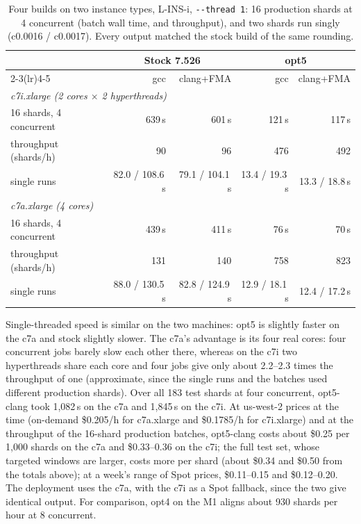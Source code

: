 \documentclass[11pt]{article}
\newcommand{\code}[1]{\texttt{#1}}
\begin{document}
\begin{table}[h]
\centering
\caption{Four builds on two instance types, L-INS-i, \code{-{}-thread 1}: 16 production
shards at 4 concurrent (batch wall time, and throughput), and two shards run singly
(c0.0016 / c0.0017). Every output matched the stock build of the same rounding.}
\label{tab:x86four}
\begin{tabular}{lrrrr}
\toprule
& \multicolumn{2}{c}{Stock 7.526} & \multicolumn{2}{c}{opt5} \\
\cmidrule(lr){2-3}\cmidrule(lr){4-5}
& gcc & clang+FMA & gcc & clang+FMA \\
\midrule
\multicolumn{5}{l}{\emph{c7i.xlarge (2 cores $\times$ 2 hyperthreads)}} \\
16 shards, 4 concurrent & 639\,s & 601\,s & 121\,s & 117\,s \\
\quad throughput (shards/h) & 90 & 96 & 476 & 492 \\
single runs & 82.0 / 108.6\,s & 79.1 / 104.1\,s & 13.4 / 19.3\,s & 13.3 / 18.8\,s \\
\midrule
\multicolumn{5}{l}{\emph{c7a.xlarge (4 cores)}} \\
16 shards, 4 concurrent & 439\,s & 411\,s & 76\,s & 70\,s \\
\quad throughput (shards/h) & 131 & 140 & 758 & 823 \\
single runs & 88.0 / 130.5\,s & 82.8 / 124.9\,s & 12.9 / 18.1\,s & 12.4 / 17.2\,s \\
\bottomrule
\end{tabular}
\end{table}

Single-threaded speed is similar on the two machines: opt5 is slightly faster on the c7a and
stock slightly slower. The c7a's advantage is its four real cores: four concurrent jobs
barely slow each other there, whereas on the c7i two hyperthreads share each core and four
jobs give only about 2.2--2.3 times the throughput of one (approximate, since the single runs
and the batches used different production shards). Over all 183 test shards at four concurrent, opt5-clang took 1{,}082\,s on the c7a and
1{,}845\,s on the c7i. At us-west-2 prices at the time (on-demand \$0.205/h for c7a.xlarge and
\$0.1785/h for c7i.xlarge) and at the throughput of the 16-shard production batches, opt5-clang
costs about \$0.25 per 1{,}000 shards on the c7a and \$0.33--0.36 on the c7i; the full test set,
whose targeted windows are larger, costs more per shard (about \$0.34 and \$0.50 from the totals
above); at a week's range of Spot prices, \$0.11--0.15 and \$0.12--0.20.
The deployment uses the c7a, with the c7i as a Spot fallback, since the two give identical
output. For comparison, opt4 on the M1 aligns about 930 shards per hour at 8 concurrent.
\end{document}
